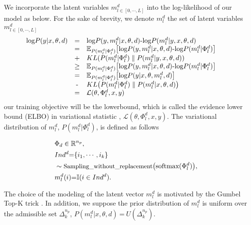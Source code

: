 \documentclass[11pt]{article}
\begin{document}
We incorporate the latent variables $m_{l\in[0,\cdots,L]}^d$ into the log-likelihood of our model as below. For the sake of brevity, we denote $m_l^d$ the set of latent variables $m_{l\in[0,\cdots,L]}^d$
\begin{equation}
\hspace{-1.5em}
\begin{array}{rcl}
\text{log} P(y|x,\theta,d) & \text{=} & \text{log} P(y, m_l^d |x,\theta,d) \text{-} \text{log} P(m_l^d|y, x,\theta,d) \\
& \text{=} & \mathbb{E}_{P(m_l^d | \Phi_l^d)} \big[ \text{log} P(y, m_l^d | x,\theta,d) \text{-} \text{log} P(m_l^d | \Phi_l^d) \big] \\
& \text{+} & KL(P(m_l^d | \Phi_l^d) \parallel P(m_l^d|y, x,\theta,d)) \\
& \geq & \mathbb{E}_{P(m_l^d | \Phi_l^d)} \big[ \text{log} P(y, m_l^d | x,\theta,d) \text{-} \text{log} P(m_l^d | \Phi_l^d) \big]  \\
& \text{=} & \mathbb{E}_{P(m_l^d | \Phi_l^d)} \big[ \text{log} P(y | x,\theta,m_l^d, d) \big] \\
& \text{-} & KL \big( P(m_l^d | \Phi_l^d) \parallel P(m_l^d | x,\theta,d) \big) \\
& \text{=} & \mathcal{L}(\theta, \Phi_l^d, x , y) \label{eq:lower-bound}
\end{array}
\end{equation}
our training objective will be the lowerbound, which is called the evidence lower bound (ELBO) in variational statistic \citep{Diederick14auto}, $\mathcal{L}(\theta, \Phi_l^d, x , y)$. The variational distribution of $m_l^d$, $P(m_l^d|\Phi_l^d)$, is defined as follows

\begin{align}
\hspace{-2.em}
&\Phi_d \in \mathbb{R}^{n_p} , \nonumber \\
&Ind^d \text{=}  \{ i_1, \cdots, i_k \} \nonumber \\
&\sim \text{\small Sampling\_without\_replacement} \big(\text{softmax}(\Phi_l^d) \big) , \nonumber \\
&m_l^d(i) \text{=} \mathbb{I}(i \in Ind^d) .\nonumber
\end{align}

The choice of the modeling of the latent vector $m_l^d$ is motivated by the Gumbel Top-K trick \citep{Kool19stochastic}. In addition, we suppose the prior distribution of $m_l^d$ is uniform over the admissible set $\Delta^{n_p}_k$, $P(m_l^d | x, \theta, d) \ \text{=} \ U(\Delta^{n_p}_k)$.
\end{document}
